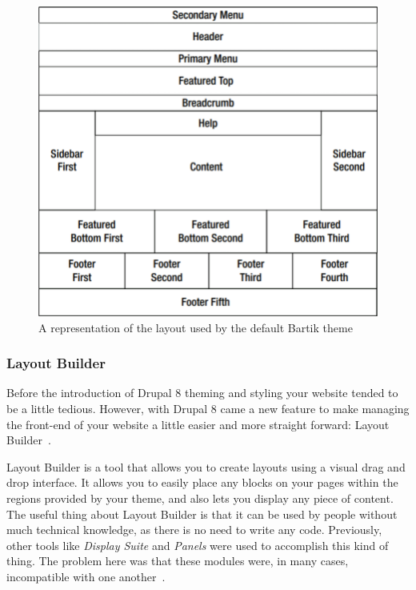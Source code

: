\begin{figure}
	\centering
	\includegraphics{./img/Bartik_Theme.png}
	\caption[The Bartik theme]{A representation of the layout used by the default Bartik theme ~\autocite{Tomlinson2015}}
\end{figure}


\subsubsection{Layout Builder}
\label{sss:lb}

Before the introduction of Drupal 8 theming and styling your website tended to be a little tedious. However, with Drupal 8 came a new feature to make managing the front-end of your website a little easier and more straight forward: Layout Builder~\autocite{Drupal2021}.

Layout Builder is a tool that allows you to create layouts using a visual drag and drop interface. It allows you to easily place any blocks on your pages within the regions provided by your theme, and also lets you display any piece of content. The useful thing about Layout Builder is that it can be used by people without much technical knowledge, as there is no need to write any code. Previously, other tools like \emph{Display Suite} and \emph{Panels} were used to accomplish this kind of thing. The problem here was that these modules were, in many cases, incompatible with one another~\autocite{Drupalize2022}.

